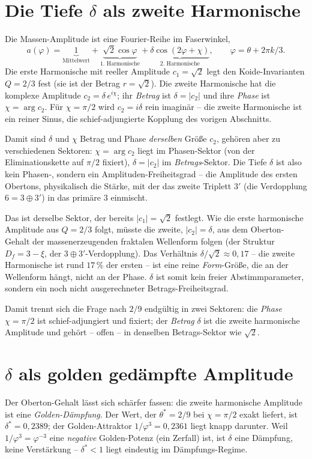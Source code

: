 \section{Die Tiefe $\delta$ als zweite Harmonische}
Die Massen-Amplitude ist eine Fourier-Reihe im Faserwinkel,
\[
a(\varphi)=\underbrace{1}_{\text{Mittelwert}}+\underbrace{\sqrt2\cos\varphi}_{\text{1.\ Harmonische}}
+\underbrace{\delta\cos(2\varphi+\chi)}_{\text{2.\ Harmonische}},\qquad \varphi=\theta+2\pi k/3.
\]
Die erste Harmonische mit reeller Amplitude $c_1=\sqrt2$ legt den Koide-Invarianten $Q=2/3$ fest
(sie ist der Betrag $r=\sqrt2$). Die zweite Harmonische hat die komplexe Amplitude
$c_2=\delta\,e^{i\chi}$; ihr \emph{Betrag} ist $\delta=|c_2|$ und ihre \emph{Phase} ist
$\chi=\arg c_2$. Für $\chi=\pi/2$ wird $c_2=i\delta$ rein imaginär -- die zweite Harmonische ist
ein reiner Sinus, die schief-adjungierte Kopplung des vorigen Abschnitts.

Damit sind $\delta$ und $\chi$ Betrag und Phase \emph{derselben} Größe $c_2$, gehören aber zu
verschiedenen Sektoren: $\chi=\arg c_2$ liegt im Phasen-Sektor (von der Eliminationskette auf
$\pi/2$ fixiert), $\delta=|c_2|$ im \emph{Betrags}-Sektor. Die Tiefe $\delta$ ist also kein
Phasen-, sondern ein Amplituden-Freiheitsgrad -- die Amplitude des ersten Obertons, physikalisch
die Stärke, mit der das zweite Triplett $3'$ (die Verdopplung $6=3\oplus3'$) in das primäre $3$
einmischt.

Das ist derselbe Sektor, der bereits $|c_1|=\sqrt2$ festlegt. Wie die erste harmonische Amplitude
aus $Q=2/3$ folgt, müsste die zweite, $|c_2|=\delta$, aus dem Oberton-Gehalt der
massenerzeugenden fraktalen Wellenform folgen (der Struktur $D_f=3-\xi$, der
$3\oplus3'$-Verdopplung). Das Verhältnis $\delta/\sqrt2\approx0{,}17$ -- die zweite Harmonische ist
rund $17\,\%$ der ersten -- ist eine reine \emph{Form}-Größe, die an der Wellenform hängt, nicht
an der Phase. $\delta$ ist somit kein freier Abstimmparameter, sondern ein noch nicht
ausgerechneter Betrags-Freiheitsgrad.

Damit trennt sich die Frage nach $2/9$ endgültig in zwei Sektoren: die \emph{Phase} $\chi=\pi/2$
ist schief-adjungiert und fixiert; der \emph{Betrag} $\delta$ ist die zweite harmonische Amplitude
und gehört -- offen -- in denselben Betrags-Sektor wie $\sqrt2$.

\section{$\delta$ als golden gedämpfte Amplitude}
Der Oberton-Gehalt lässt sich schärfer fassen: die zweite harmonische Amplitude ist eine
\emph{Golden-Dämpfung}. Der Wert, der $\theta^*=2/9$ bei $\chi=\pi/2$ exakt liefert, ist
$\delta^*=0{,}2389$; der Golden-Attraktor $1/\varphi^3=0{,}2361$ liegt knapp darunter. Weil
$1/\varphi^3=\varphi^{-3}$ eine \emph{negative} Golden-Potenz (ein Zerfall) ist, ist $\delta$
eine Dämpfung, keine Verstärkung -- $\delta^*<1$ liegt eindeutig im Dämpfungs-Regime.

